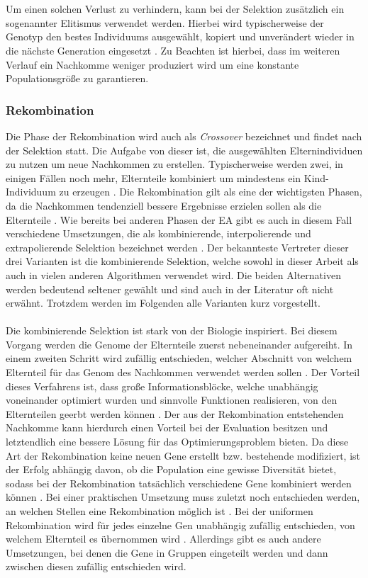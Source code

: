 \\\\
Um einen solchen Verlust zu verhindern, kann bei der Selektion zusätzlich ein sogenannter Elitismus verwendet werden. Hierbei wird typischerweise der Genotyp den bestes Individuums ausgewählt, kopiert und unverändert wieder in die nächste Generation eingesetzt \cite{such2017deep}. Zu Beachten ist hierbei, dass im weiteren Verlauf ein Nachkomme weniger produziert wird um eine konstante Populationsgröße zu garantieren. 

\subsubsection{Rekombination}
Die Phase der Rekombination wird auch als \emph{Crossover} bezeichnet und findet nach der Selektion statt. Die Aufgabe von dieser ist, die ausgewählten Elternindividuen zu nutzen um neue Nachkommen zu erstellen. Typischerweise werden zwei, in einigen Fällen noch mehr, Elternteile kombiniert um mindestens ein Kind-Individuum zu erzeugen \cite{weicker2015evolutionare}. Die Rekombination gilt als eine der wichtigsten Phasen, da die Nachkommen tendenziell bessere Ergebnisse erzielen sollen als die Elternteile \cite{russell2013kunstliche}. Wie bereits bei anderen Phasen der \ac{EA} gibt es auch in diesem Fall verschiedene Umsetzungen, die als kombinierende, interpolierende und extrapolierende Selektion bezeichnet werden \cite{weicker2015evolutionare}. Der bekannteste Vertreter dieser drei Varianten ist die kombinierende Selektion, welche sowohl in dieser Arbeit als auch in vielen anderen Algorithmen verwendet wird. Die beiden Alternativen werden bedeutend seltener gewählt und sind auch in der Literatur oft nicht erwähnt. Trotzdem werden im Folgenden alle Varianten kurz vorgestellt.
\\\\
Die kombinierende Selektion ist stark von der Biologie inspiriert. Bei diesem Vorgang werden die Genome der Elternteile zuerst nebeneinander aufgereiht. In einem zweiten Schritt wird zufällig entschieden, welcher Abschnitt von welchem Elternteil für das Genom des Nachkommen verwendet werden sollen \cite{weicker2015evolutionare}. Der Vorteil dieses Verfahrens ist, dass große Informationsblöcke, welche unabhängig voneinander optimiert wurden und sinnvolle Funktionen realisieren, von den Elternteilen geerbt werden können \cite{russell2013kunstliche}. Der aus der Rekombination entstehenden Nachkomme kann hierdurch einen Vorteil bei der Evaluation besitzen und letztendlich eine bessere Lösung für das Optimierungsproblem bieten. Da diese Art der Rekombination keine neuen Gene erstellt bzw. bestehende modifiziert, ist der Erfolg abhängig davon, ob die Population eine gewisse Diversität bietet, sodass bei der Rekombination tatsächlich verschiedene Gene kombiniert werden können \cite{weicker2015evolutionare}. Bei einer praktischen Umsetzung muss zuletzt noch entschieden werden, an welchen Stellen eine Rekombination möglich ist \cite{rojas1996neural}. Bei der uniformen Rekombination wird  für jedes einzelne Gen unabhängig zufällig entschieden, von welchem Elternteil es übernommen wird \cite{weicker2015evolutionare}. Allerdings gibt es auch andere Umsetzungen, bei denen die Gene in Gruppen eingeteilt werden und dann zwischen diesen zufällig entschieden wird.
